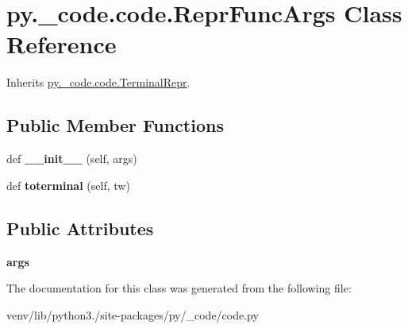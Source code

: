\hypertarget{classpy_1_1__code_1_1code_1_1_repr_func_args}{}\section{py.\+\_\+code.\+code.\+Repr\+Func\+Args Class Reference}
\label{classpy_1_1__code_1_1code_1_1_repr_func_args}


Inherits \hyperlink{classpy_1_1__code_1_1code_1_1_terminal_repr}{py.\+\_\+code.\+code.\+Terminal\+Repr}.

\subsection*{Public Member Functions}
\begin{DoxyCompactItemize}
\item 
\mbox{\label{classpy_1_1__code_1_1code_1_1_repr_func_args_aea06dd6589f8b0e8e6de0da4e9201b6d}} 
def {\bfseries \+\_\+\+\_\+init\+\_\+\+\_\+} (self, args)
\item 
\mbox{\label{classpy_1_1__code_1_1code_1_1_repr_func_args_af1cc3df7d6e4fb209ae2f0b33567d94a}} 
def {\bfseries toterminal} (self, tw)
\end{DoxyCompactItemize}
\subsection*{Public Attributes}
\begin{DoxyCompactItemize}
\item 
\mbox{\label{classpy_1_1__code_1_1code_1_1_repr_func_args_aaedca42ae38c3630e0c30110f58185f9}} 
{\bfseries args}
\end{DoxyCompactItemize}


The documentation for this class was generated from the following file\+:\begin{DoxyCompactItemize}
\item 
venv/lib/python3./site-\/packages/py/\+\_\+code/code.\+py\end{DoxyCompactItemize}
